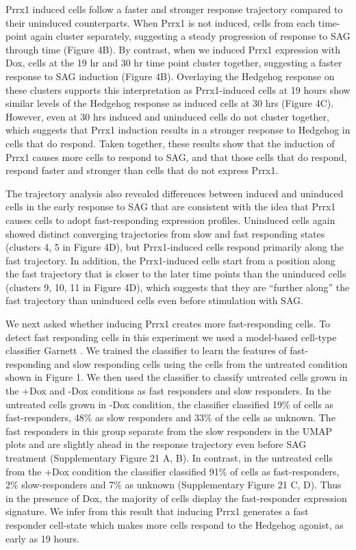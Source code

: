 Prrx1 induced cells follow a faster and stronger response trajectory compared to their uninduced counterparts. When Prrx1 is not induced, cells from each time-point again cluster separately, suggesting a steady progression of response to SAG through time (Figure 4B). By contrast, when we induced Prrx1 expression with Dox, cells at the 19 hr and 30 hr time point cluster together, suggesting a faster response to SAG induction (Figure 4B). Overlaying the Hedgehog response on these clusters supports this interpretation as Prrx1-induced cells at 19 hours show similar levels of the Hedgehog response as induced cells at 30 hrs (Figure 4C). However, even at 30 hrs induced and uninduced cells do not cluster together, which suggests that Prrx1 induction results in a stronger response to Hedgehog in cells that do respond. Taken together, these results show that the induction of Prrx1 causes more cells to respond to SAG, and that those cells that do respond, respond faster and stronger than cells that do not express Prrx1.

The trajectory analysis also revealed differences between induced and uninduced cells in the early response to SAG that are consistent with the idea that Prrx1 causes cells to adopt fast-responding expression profiles. Uninduced cells again showed distinct converging trajectories from slow and fast responding states (clusters 4, 5 in Figure 4D), but Prrx1-induced cells respond primarily along the fast trajectory. In addition, the Prrx1-induced cells start from a position along the fast trajectory that is closer to the later time points than the uninduced cells (clusters 9, 10, 11 in Figure 4D), which suggests that they are “further along” the fast trajectory than uninduced cells even before stimulation with SAG. 

We next asked whether inducing Prrx1 creates more fast-responding cells. To detect fast responding cells in this experiment we used a model-based cell-type classifier Garnett \cite{Pliner2019-vn}. We trained the classifier to learn the features of fast-responding and slow responding cells using the cells from the untreated condition shown in Figure 1. We then used the classifier to classify untreated cells grown in the +Dox and -Dox conditions as fast responders and slow responders. In the untreated cells grown in -Dox condition, the classifier classified 19\% of cells as fast-responders, 48\% as slow responders and 33\% of the cells as unknown. The fast responders in this group separate from the slow responders in the UMAP plots and are slightly ahead in the response trajectory even before SAG treatment  (Supplementary Figure 21 A, B). In contrast, in the untreated cells from the +Dox condition the classifier classified 91\% of cells as fast-responders, 2\% slow-responders and 7\% as unknown (Supplementary Figure 21 C, D). Thus in the presence of Dox, the majority of cells display the fast-responder expression signature. We infer from this result that inducing Prrx1 generates a fast responder cell-state which makes more cells respond to the Hedgehog agonist, as early as 19 hours.

